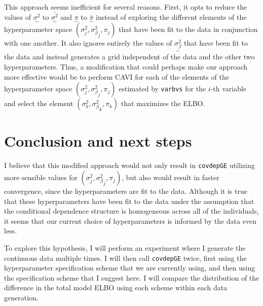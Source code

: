 \documentclass[twoside]{article}
\newcommand{\1}{\\[1ex]}
\newcommand{\2}{\\[2ex]}
\newcommand{\3}{\\[3ex]}
\newcommand{\4}{\\[4ex]}
\begin{document}
This approach seems inefficient for several reasons. First, it opts to reduce the values of $\underset\sim{\sigma^2}$ to $\bar{\underset\sim{\sigma^2}}$ and $\underset\sim{\pi}$ to $\bar{\underset\sim{\pi}}$ instead of exploring the different elements of the hyperparameter space $(\sigma^2_j, {\sigma^2_\beta}_j, \pi_j)$ that have been fit to the data in conjunction with one another. It also ignores entirely the values of $\underset\sim{\sigma^2_\beta}$ that have been fit to the data and instead generates a grid independent of the data and the other two hyperparameters. Thus, a modification that could perhaps make our approach more effective would be to perform CAVI for each of the elements of the hyperparameter space $(\sigma^2_j, {\sigma^2_\beta}_j, \pi_j)$ estimated by \texttt{varbvs} for the $i$-th variable and select the element $(\sigma^2_k, {\sigma^2_\beta}_k, \pi_k)$ that maximizes the ELBO.   

\section{Conclusion and next steps}

I believe that this modified approach would not only result in \texttt{covdepGE} utilizing more sensible values for $(\sigma^2_j, {\sigma^2_\beta}_j, \pi_j)$, but also would result in faster convergence, since the hyperparameters are fit to the data. Although it is true that these hyperparameters have been fit to the data under the assumption that the conditional dependence structure is homogeneous across all of the individuals, it seems that our current choice of hyperparameters is informed by the data even less. 

To explore this hypothesis, I will perform an experiment where I generate the continuous data multiple times. I will then call \texttt{covdepGE} twice, first using the hyperparameter specification scheme that we are currently using, and then using the specification scheme that I suggest here. I will compare the distribution of the difference in the total model ELBO using each scheme within each data generation.
\end{document}
